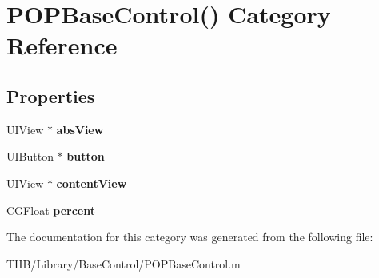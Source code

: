 \hypertarget{category_p_o_p_base_control_07_08}{}\section{P\+O\+P\+Base\+Control() Category Reference}
\label{category_p_o_p_base_control_07_08}
\subsection*{Properties}
\begin{DoxyCompactItemize}
\item 
\mbox{\label{category_p_o_p_base_control_07_08_a0218685d3b38ea80991149bad8c2e3e2}} 
U\+I\+View $\ast$ {\bfseries abs\+View}
\item 
\mbox{\label{category_p_o_p_base_control_07_08_a70b10fe15a35bc587d5699acd8a07344}} 
U\+I\+Button $\ast$ {\bfseries button}
\item 
\mbox{\label{category_p_o_p_base_control_07_08_a8ff3fddfcc142247542c9e9b52ff67ed}} 
U\+I\+View $\ast$ {\bfseries content\+View}
\item 
\mbox{\label{category_p_o_p_base_control_07_08_afef9021af26ee5571c07c1c584e13bbf}} 
C\+G\+Float {\bfseries percent}
\end{DoxyCompactItemize}


The documentation for this category was generated from the following file\+:\begin{DoxyCompactItemize}
\item 
T\+H\+B/\+Library/\+Base\+Control/P\+O\+P\+Base\+Control.\+m\end{DoxyCompactItemize}
